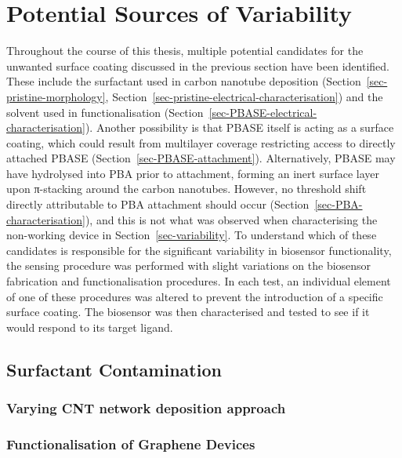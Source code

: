 \documentclass[
  a4paper,
]{scrbook}
\begin{document}
\hypertarget{sec-contamination}{%
\section{Potential Sources of Variability}\label{sec-contamination}}

Throughout the course of this thesis, multiple potential candidates for
the unwanted surface coating discussed in the previous section have been
identified. These include the surfactant used in carbon nanotube
deposition (Section~\ref{sec-pristine-morphology},
Section~\ref{sec-pristine-electrical-characterisation}) and the solvent
used in functionalisation
(Section~\ref{sec-PBASE-electrical-characterisation}). Another
possibility is that PBASE itself is acting as a surface coating, which
could result from multilayer coverage restricting access to directly
attached PBASE (Section~\ref{sec-PBASE-attachment}). Alternatively,
PBASE may have hydrolysed into PBA prior to attachment, forming an inert
surface layer upon π-stacking around the carbon nanotubes. However, no
threshold shift directly attributable to PBA attachment should occur
(Section~\ref{sec-PBA-characterisation}), and this is not what was
observed when characterising the non-working device in
Section~\ref{sec-variability}. To understand which of these candidates
is responsible for the significant variability in biosensor
functionality, the sensing procedure was performed with slight
variations on the biosensor fabrication and functionalisation
procedures. In each test, an individual element of one of these
procedures was altered to prevent the introduction of a specific surface
coating. The biosensor was then characterised and tested to see if it
would respond to its target ligand.

\hypertarget{sec-cnt-deposition-effects}{%
\subsection{Surfactant Contamination}\label{sec-cnt-deposition-effects}}

\hypertarget{varying-cnt-network-deposition-approach}{%
\subsubsection*{Varying CNT network deposition
approach}\label{varying-cnt-network-deposition-approach}}

\hypertarget{functionalisation-of-graphene-devices}{%
\subsubsection*{Functionalisation of Graphene
Devices}\label{functionalisation-of-graphene-devices}}
\end{document}
